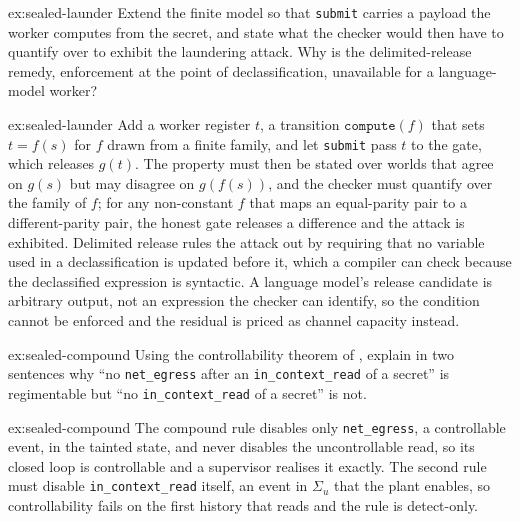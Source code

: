 \documentclass[11pt,a4paper]{article}
\theoremstyle{definition}
\begin{document}
\begin{pdexercise}[kind=Open,rating=3]{ex:sealed-launder}
Extend the finite model so that \texttt{submit} carries a payload the worker
computes from the secret, and state what the checker would then have to
quantify over to exhibit the laundering attack. Why is the delimited-release
remedy, enforcement at the point of declassification, unavailable for a
language-model worker?
\end{pdexercise}
\begin{pdsolution}{ex:sealed-launder}
Add a worker register $t$, a transition $\mathtt{compute}(f)$ that sets
$t=f(s)$ for $f$ drawn from a finite family, and let \texttt{submit} pass $t$
to the gate, which releases $g(t)$. The property must then be stated over
worlds that agree on $g(s)$ but may disagree on $g(f(s))$, and the checker must
quantify over the family of $f$; for any non-constant $f$ that maps an
equal-parity pair to a different-parity pair, the honest gate releases a
difference and the attack is exhibited. Delimited release rules the attack out
by requiring that no variable used in a declassification is updated before it,
which a compiler can check because the declassified expression is syntactic.
A language model's release candidate is arbitrary output, not an expression
the checker can identify, so the condition cannot be enforced and the residual
is priced as channel capacity instead.
\end{pdsolution}

\begin{pdexercise}[kind=Check,rating=1]{ex:sealed-compound}
Using the controllability theorem of ,
explain in two sentences why ``no \texttt{net\_egress} after an
\texttt{in\_context\_read} of a secret'' is regimentable but ``no
\texttt{in\_context\_read} of a secret'' is not.
\end{pdexercise}
\begin{pdsolution}{ex:sealed-compound}
The compound rule disables only \texttt{net\_egress}, a controllable event, in
the tainted state, and never disables the uncontrollable read, so its closed
loop is controllable and a supervisor realises it exactly. The second rule
must disable \texttt{in\_context\_read} itself, an event in $\Sigma_u$ that the
plant enables, so controllability fails on the first history that reads and the
rule is detect-only.
\end{pdsolution}
\end{document}
